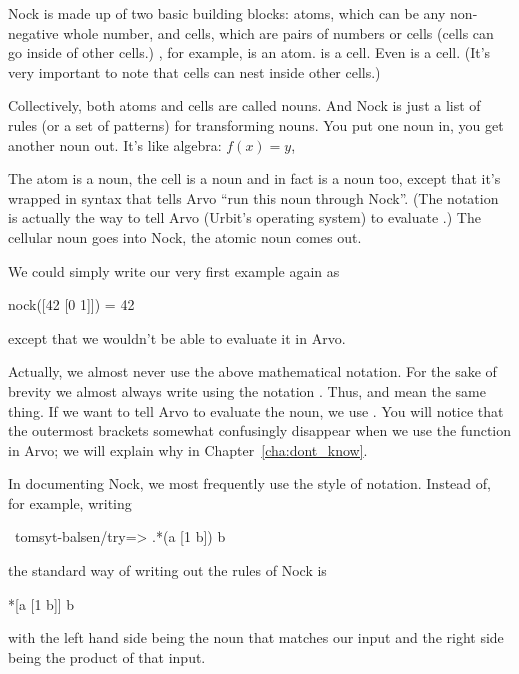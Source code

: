 Nock is made up of two basic building blocks: atoms, which can be any
non-negative whole number, and cells, which are pairs of numbers or cells
(cells can go inside of other cells.) , for example, is an atom. \kode{[0 1]} is
a cell. Even \kode{[42 [0 1]]} is a cell. (It's very important to note that cells
can nest inside other cells.)

Collectively, both atoms and cells are called nouns. And Nock is just a list of
rules (or a set of patterns) for transforming nouns.  You put one noun in, you
get another noun out. It's like algebra: \( f(x) = y \), 

The atom  is a noun, the cell \kode{[0 1]} is a noun and in fact 
is a noun too, except that it's wrapped in syntax that tells Arvo ``run
this noun through Nock''. (The notation  is actually the way to tell Arvo
(Urbit's operating system) to evaluate .) The cellular noun
\kode{[42 [0 1]]} goes into Nock, the atomic noun  comes out.

We could simply write our very first example again as

\begin{code}
nock([42 [0 1]]) = 42
\end{code}
except that we wouldn't be able to evaluate it in Arvo.

Actually, we almost never use the above mathematical notation. For the sake of
brevity we almost always write  using the notation . Thus,  and \kode{*[42 [0 1]]} mean the same thing. If we want to tell Arvo to evaluate
the noun, we use . You will notice that the outermost brackets
somewhat confusingly disappear when we use the  function in Arvo; we will
explain why in Chapter~\ref{cha:dont_know}.

In documenting Nock, we most frequently use the \kode{*[42 [0 1]]} style of
notation. Instead of, for example, writing

\begin{code}
~tomsyt-balsen/try=> .*(a [1 b])
b
\end{code}

the standard way of writing out the rules of Nock is

\begin{code}
*[a [1 b]]                  b
\end{code}
with the left hand side being the noun that matches our input and the right
side being the product of that input.

